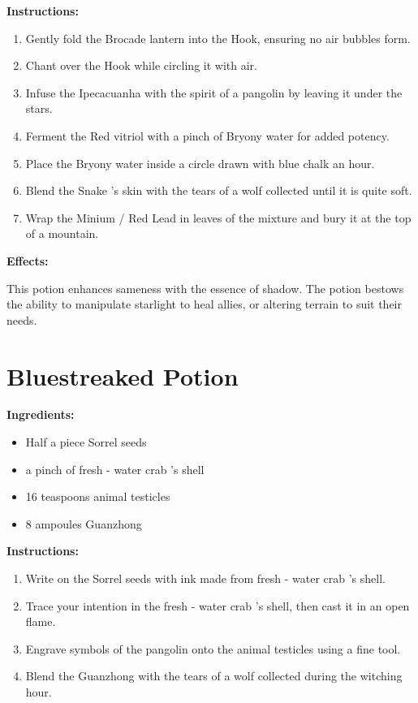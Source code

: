 \documentclass{article}
\begin{document}
\textbf{Instructions:}

\begin{enumerate}
  \item Gently fold the Brocade lantern into the Hook, ensuring no air bubbles form.
  \item Chant over the Hook while circling it with air.
  \item Infuse the Ipecacuanha with the spirit of a pangolin by leaving it under the stars.
  \item Ferment the Red vitriol with a pinch of Bryony water for added potency.
  \item Place the Bryony water inside a circle drawn with blue chalk an hour.
  \item Blend the Snake 's skin with the tears of a wolf collected until it is quite soft.
  \item Wrap the Minium / Red Lead in leaves of the mixture and bury it at the top of a mountain.
\end{enumerate}

\textbf{Effects:}

This potion enhances sameness with the essence of shadow. The potion bestows the ability to manipulate starlight to heal allies, or altering terrain to suit their needs.

\newpage
\section*{Bluestreaked Potion}

\textbf{Ingredients:}

\begin{itemize}
  \item Half a piece Sorrel seeds
  \item a pinch of fresh - water crab 's shell
  \item 16 teaspoons animal testicles
  \item 8 ampoules Guanzhong
\end{itemize}

\textbf{Instructions:}

\begin{enumerate}
  \item Write on the Sorrel seeds with ink made from fresh - water crab 's shell.
  \item Trace your intention in the fresh - water crab 's shell, then cast it in an open flame.
  \item Engrave symbols of the pangolin onto the animal testicles using a fine tool.
  \item Blend the Guanzhong with the tears of a wolf collected during the witching hour.
\end{enumerate}
\end{document}
